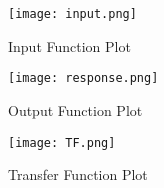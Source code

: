 \documentclass[journal,12pt,twocolumn]{IEEEtran}
\begin{document}
\begin{figure}[!ht]
         \centering
         \texttt{[image: input.png]}
         \caption{Input Function Plot}
\end{figure}

\begin{figure}[!ht]
         \centering
         \texttt{[image: response.png]}
         \caption{Output Function Plot}
\end{figure}

\begin{figure}[!ht]
         \centering
         \texttt{[image: TF.png]}
         \caption{Transfer Function Plot}
\end{figure}
\end{document}
